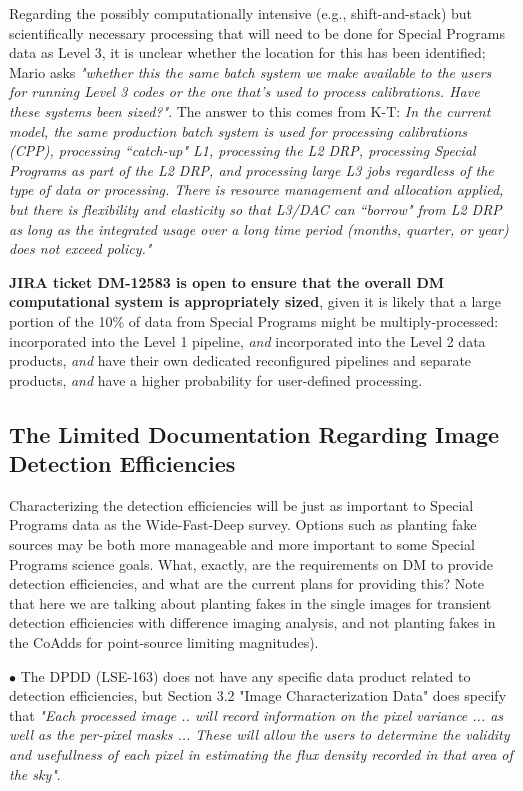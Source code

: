 Regarding the possibly computationally intensive (e.g., shift-and-stack) but scientifically necessary processing that will need to be done for Special Programs data as Level 3, it is unclear whether the location for this has been identified; Mario asks \textit{"whether this the same batch system we make available to the users for running Level 3 codes or the one that's used to process calibrations. Have these systems been sized?"}. The answer to this comes from K-T: \textit{In the current model, the same production batch system is used for processing calibrations (CPP), processing ``catch-up" L1, processing the L2 DRP, processing Special Programs as part of the L2 DRP, and processing large L3 jobs regardless of the type of data or processing. There is resource management and allocation applied, but there is flexibility and elasticity so that L3/DAC can ``borrow" from L2 DRP as long as the integrated usage over a long time period (months, quarter, or year) does not exceed policy."}

{\bf JIRA ticket DM-12583 is open to ensure that the overall DM computational system is appropriately sized}, given it is likely that a large portion of the 10\% of data from Special Programs might be multiply-processed: incorporated into the Level 1 pipeline, \textit{and} incorporated into the Level 2 data products, \textit{and} have their own dedicated reconfigured pipelines and separate products, \textit{and} have a higher probability for user-defined processing.

\subsection{The Limited Documentation Regarding Image Detection Efficiencies}

Characterizing the detection efficiencies will be just as important to Special Programs data as the Wide-Fast-Deep survey. Options such as planting fake sources may be both more manageable and more important to some Special Programs science goals. What, exactly, are the requirements on DM to provide detection efficiencies, and what are the current plans for providing this? Note that here we are talking about planting fakes in the single images for transient detection efficiencies with difference imaging analysis, and not planting fakes in the CoAdds for point-source limiting magnitudes).

$\bullet$ The DPDD (LSE-163) does not have any specific data product related to detection efficiencies, but Section 3.2 "Image Characterization Data" does specify that \textit{"Each processed image .. will record information on the pixel variance ... as well as the per-pixel masks ... These will allow the users to determine the validity and usefullness of each pixel in estimating the flux density recorded in that area of the sky"}.

